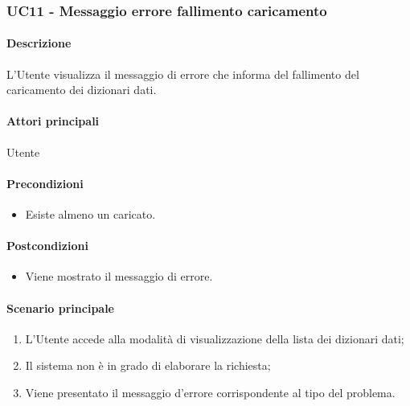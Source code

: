 \subsubsection{UC11 - Messaggio errore fallimento caricamento }\label{UC11}
\paragraph*{Descrizione}
L’Utente visualizza il messaggio di errore che informa del fallimento del caricamento dei dizionari dati.

\paragraph*{Attori principali}
Utente

\paragraph*{Precondizioni}
\begin{itemize}
  \item Esiste almeno un  caricato.  
\end{itemize}

\paragraph*{Postcondizioni}
\begin{itemize}
  \item Viene mostrato il messaggio di errore.
\end{itemize}

\paragraph*{Scenario principale}
\begin{enumerate}
  \item L’Utente accede alla modalità di visualizzazione della lista dei dizionari dati;
  \item Il sistema non è in grado di elaborare la richiesta;
  \item Viene presentato il messaggio d’errore corrispondente al tipo del problema.  
\end{enumerate}
